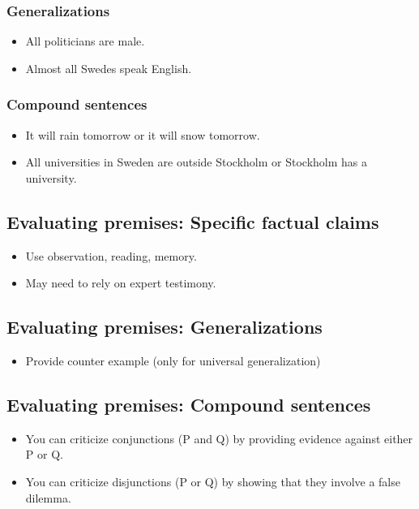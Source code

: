 \subsubsection{Generalizations}

\begin{itemize}
    \item All politicians are male.
    \item Almost all Swedes speak English.
\end{itemize}

\subsubsection{Compound sentences}

\begin{itemize}
    \item It will rain tomorrow or it will snow tomorrow.
    \item All universities in Sweden are outside Stockholm
        or Stockholm has a university.
\end{itemize}

\subsection{Evaluating premises: Specific factual claims}

\begin{itemize}
    \item Use observation, reading, memory.
    \item May need to rely on expert testimony.
\end{itemize}

\subsection{Evaluating premises: Generalizations}

\begin{itemize}
    \item Provide counter example (only for universal generalization)
\end{itemize}

\subsection{Evaluating premises: Compound sentences}

\begin{itemize}
    \item You can criticize conjunctions (P and Q) by providing evidence
        against either P or Q.
    \item You can criticize disjunctions (P or Q) by showing that they
        involve a false dilemma.
\end{itemize}

